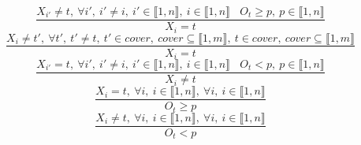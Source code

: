 $$\frac{X_{i'} \neq t,~\forall i',~i' \neq i,~i' \in \llbracket1,n\rrbracket,~i \in \llbracket1,n\rrbracket~~~~O_{t} \geq p,~p \in \llbracket1,n\rrbracket}{X_{i}=t}$$ $$\frac{X_{i} \neq t',~\forall t',~t' \neq t,~t' \in cover,~cover \subseteq \llbracket1,m\rrbracket,~t \in cover,~cover \subseteq \llbracket1,m\rrbracket}{X_{i}=t}$$ $$\frac{X_{i'}=t,~\forall i',~i' \neq i,~i' \in \llbracket1,n\rrbracket,~i \in \llbracket1,n\rrbracket~~~~O_{t}<p,~p \in \llbracket1,n\rrbracket}{X_{i} \neq t}$$ $$\frac{X_{i}=t,~\forall i,~i \in \llbracket1,n\rrbracket,~\forall i,~i \in \llbracket1,n\rrbracket}{O_{t} \geq p}$$ $$\frac{X_{i} \neq t,~\forall i,~i \in \llbracket1,n\rrbracket,~\forall i,~i \in \llbracket1,n\rrbracket}{O_{t}<p}$$ 
